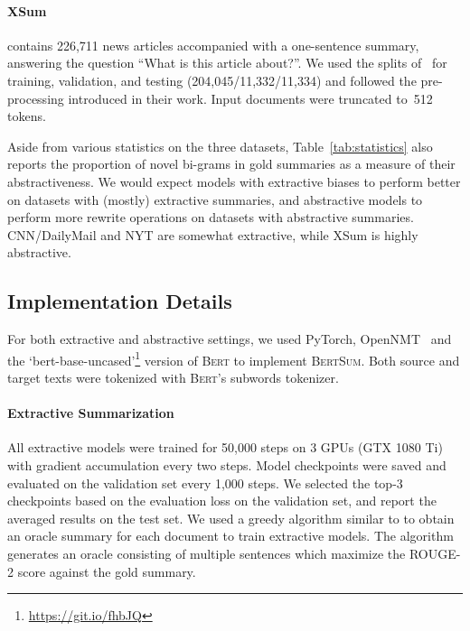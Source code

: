 \documentclass[11pt,a4paper]{article}
\begin{document}
    \vspace{-1ex}
    \paragraph{XSum} contains 226,711 news articles accompanied with a
    one-sentence summary, answering the question ``What is this
    article about?''.  We used the splits of~\citet{xsum} for
    training, validation, and testing (204,045/11,332/11,334) and
    followed the pre-processing introduced in their work.  Input
    documents were truncated to~512 tokens.
    
    
    Aside from various statistics on the three datasets,
    Table~\ref{tab:statistics} also reports the proportion of novel
    bi-grams in gold summaries as a measure of their
    abstractiveness. We would expect models with extractive biases to
    perform better on datasets with (mostly) extractive summaries, and
    abstractive models to perform more rewrite operations on datasets
    with abstractive summaries. CNN/DailyMail and NYT are somewhat
    extractive, while XSum is highly abstractive.
    
    
    \subsection{Implementation Details} 
    For both extractive and abstractive settings, we used PyTorch,
    OpenNMT~\cite{klein2017opennmt} and the
    `bert-base-uncased'\footnote{\url{https://git.io/fhbJQ}} version of
    \textsc{Bert} to implement \textsc{BertSum}.  Both source and
    target texts were tokenized with \textsc{Bert}'s subwords tokenizer.
    
    
    \paragraph{Extractive Summarization}
    All extractive models were trained for 50,000 steps on 3 GPUs (GTX
    1080 Ti) with gradient accumulation every two steps.  Model
    checkpoints were saved and evaluated on the validation set every
    1,000 steps. We selected the top-3 checkpoints based on the
    evaluation loss on the validation set, and report the averaged
    results on the test set.    
    We used a greedy
    algorithm similar to \citet{nallapati2017summarunner} to obtain an
    oracle summary for each document to train extractive models. The algorithm generates an oracle
    consisting of multiple sentences which maximize the ROUGE-2 score
    against the gold summary. 
    
\end{document}
